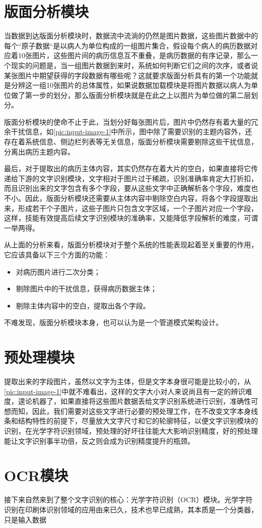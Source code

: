 \section{版面分析模块}
当数据到达版面分析模块时，数据流中流淌的仍然是图片数据，这些图片数据中的每个“原子数据“是以病人为单位构成的一组图片集合，假设每个病人的病历数据对应着10张图片，这些图片间的病历信息互不重叠，是病历数据的有序记录，那么一个现实的问题是，当一组图片数据到来时，系统如何判断它们之间的次序，或者说某张图片中期望获得的字段数据有哪些呢？这就要求版面分析具有的第一个功能就是分辨这一组10张图片的总体属性，如果说数据加载模块是将图片数据以病人为单位做了第一步的划分，那么版面分析模块就是在此之上以图片为单位做的第二层划分。

版面分析模块的使命不止于此，当划分好每张图片后，图片中仍然存有着大量的冗余干扰信息，如\autoref{pic:input-image-1}中所示，图中除了需要识别的主题内容外，还存在着系统信息、侧边栏列表等无关信息，版面分析模块需要剔除这些干扰信息，分离出病历主题内容。

最后，对于提取出的病历主体内容，其实仍然存在着大片的空白，如果直接将它传递给下游的文字识别模块，文字相对于图片过于稀疏，识别准确率肯定大打折扣，而且识别出来的文字包含有多个字段，要从这些文字中正确解析各个字段，难度也不小。因此，版面分析模块还需要从主体内容中剔除空白内容，将各个字段提取出来，形成若干个子图片，这些子图片只包含文字区域，一个子图片对应一个字段，这样，技能有效提高后续文字识别模块的准确率，又能降低字段解析的难度，可谓一举两得。

从上面的分析来看，版面分析模块对于整个系统的性能表现起着至关重要的作用，它应该具备以下三个方面的功能：
\begin{itemize}
	\item 对病历图片进行二次分类；
	\item 剔除图片中的干扰信息，获得病历数据主体；
	\item 剔除主体内容中的空白，提取出各个字段。
\end{itemize}
不难发现，版面分析模块本身，也可以认为是一个管道模式架构设计。

\section{预处理模块}
提取出来的字段图片，虽然以文字为主体，但是文字本身很可能是比较小的，从\autoref{pic:input-image-1}中就不难看出，这样的文字大小对人来说尚且有一定的辨识难度，遑论机器了，如果直接将这些图片数据丢给文字识别系统进行识别，准确性可想而知，因此，我们需要对这些文字进行必要的预处理工作，在不改变文字本身线条和结构特性的前提下，尽量放大文字尺寸和它的轮廓特征，以便文字识别模块的识别，在光学字符识别领域，预处理的好坏往往能大大影响识别精度，好的预处理能让文字识别事半功倍，反之则会成为识别精度提升的瓶颈。

\section{OCR模块}
接下来自然来到了整个文字识别的核心：光学字符识别（OCR）模块。光学字符识别在印刷体识别领域的应用由来已久\citep{impedovo1991optical}，技术也早已成熟，其本质是一个分类器，只是输入数据